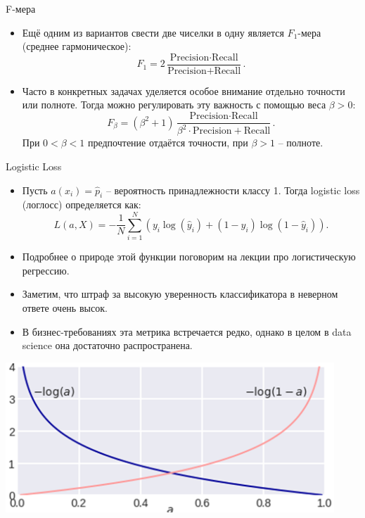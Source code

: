 \documentclass[9pt]{beamer}
\begin{document}
\begin{frame}{F-мера}
    \begin{itemize}
        \item Ещё одним из вариантов свести две чиселки в одну является $F_1$-мера (среднее гармоническое):
        $$F_1 = 2 \frac{\text{Precision}\cdot \text{Recall}}{\text{Precision} + \text{Recall}}.$$
        \item Часто в конкретных задачах уделяется особое внимание отдельно точности или полноте. Тогда можно регулировать эту важность с помощью веса $\beta > 0$:
        $$F_\beta = (\beta^2 + 1) \frac{\text{Precision}\cdot \text{Recall}}{\beta^2 \cdot \text{Precision} + \text{Recall}}.$$
        При $0 < \beta < 1$ предпочтение отдаётся точности, при $\beta > 1$ -- полноте.
    \end{itemize}
\end{frame}

\begin{frame}{Logistic Loss}
\begin{itemize}
    \item Пусть $a(x_i) = \hat p_i$ -- вероятность принадлежности классу 1. Тогда logistic loss (логлосс) определяется как:
    $$L(a, X) = - \frac{1}{N}\sum_{i=1}^N\left(y_i \log(\hat y_i) + (1 - y_i)\log(1 - \hat y_i)\right).$$
    \item Подробнее о природе этой функции поговорим на лекции про логистическую регрессию.
    \item Заметим, что штраф за высокую уверенность классификатора в неверном ответе очень высок.
    \item В бизнес-требованиях эта метрика встречается редко, однако в целом в data science она достаточно распространена.
\end{itemize}
\begin{center}
    \includegraphics[height=0.3\textheight]{img/log_loss.png}    
\end{center}
\end{frame}
\end{document}
